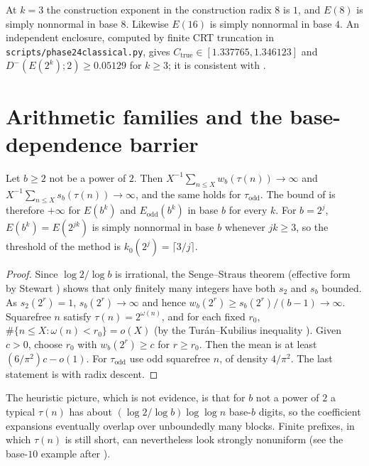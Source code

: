 \documentclass[11pt]{article}
\newcommand{\ttbreak}{\discretionary{}{}{}}
\newcommand{\ttt}[1]{\texttt{\begingroup\def\_{\textunderscore\ttbreak}#1\endgroup}}
\newcommand{\Ctrue}{C_{\mathrm{true}}}
\begin{document}
\begin{remark}\label{rem:own-radix}
At $k=3$ the construction exponent in the construction radix $8$ is $1$, and $E(8)$ is simply nonnormal in base $8$. Likewise $E(16)$ is simply nonnormal in base $4$. An independent enclosure, computed by finite CRT truncation in \ttt{scripts/phase24\_classical.py}, gives $\Ctrue\in[1.337765,1.346123]$ and $D^-(E(2^k);2)\ge0.05129$ for $k\ge3$; it is consistent with .
\end{remark}

\section{Arithmetic families and the base-dependence barrier}\label{sec:families}

\begin{theorem}[Barrier]\label{thm:barrier}
Let $b\ge2$ not be a power of $2$. Then $X^{-1}\sum_{n\le X}w_b(\tau(n))\to\infty$ and $X^{-1}\sum_{n\le X}s_b(\tau(n))\to\infty$, and the same holds for $\tau_{\mathrm{odd}}$. The bound of  is therefore $+\infty$ for $E(b^k)$ and $E_{\mathrm{odd}}(b^k)$ in base $b$ for every $k$. For $b=2^j$, $E(b^k)=E(2^{jk})$ is simply nonnormal in base $b$ whenever $jk\ge3$, so the threshold of the method is $k_0(2^j)=\lceil3/j\rceil$.
\end{theorem}

\begin{proof}
Since $\log2/\log b$ is irrational, the Senge--Straus theorem \cite{SengeStraus73} (effective form by Stewart \cite{Stewart80}) shows that only finitely many integers have both $s_2$ and $s_b$ bounded. As $s_2(2^r)=1$, $s_b(2^r)\to\infty$ and hence $w_b(2^r)\ge s_b(2^r)/(b-1)\to\infty$. Squarefree $n$ satisfy $\tau(n)=2^{\omega(n)}$, and for each fixed $r_0$, $\#\{n\le X:\omega(n)<r_0\}=o(X)$ (by the Tur\'an--Kubilius inequality \cite{Tenenbaum}). Given $c>0$, choose $r_0$ with $w_b(2^r)\ge c$ for $r\ge r_0$. Then the mean is at least $(6/\pi^2)c-o(1)$. For $\tau_{\mathrm{odd}}$ use odd squarefree $n$, of density $4/\pi^2$. The last statement is  with radix descent.
\end{proof}

The heuristic picture, which is not evidence, is that for $b$ not a power of $2$ a typical $\tau(n)$ has about $(\log2/\log b)\log\log n$ base-$b$ digits, so the coefficient expansions eventually overlap over unboundedly many blocks. Finite prefixes, in which $\tau(n)$ is still short, can nevertheless look strongly nonuniform (see the base-$10$ example after ).
\end{document}

